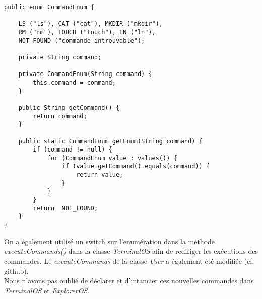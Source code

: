 \begin{lstlisting}
public enum CommandEnum {

    LS ("ls"), CAT ("cat"), MKDIR ("mkdir"), 
    RM ("rm"), TOUCH ("touch"), LN ("ln"),
    NOT_FOUND ("commande introuvable");

    private String command;

    private CommandEnum(String command) {
        this.command = command;
    }

    public String getCommand() {
        return command;
    }

    public static CommandEnum getEnum(String command) {
        if (command != null) {
            for (CommandEnum value : values()) {
                if (value.getCommand().equals(command)) {
                    return value;
                }
            }
        }
        return  NOT_FOUND;
    }
}
\end{lstlisting}

On a également utilisé un switch sur l'enumération dans la méthode \emph{executeCommands()} dans la classe \emph{TerminalOS} afin de rediriger les exécutions des commandes. Le \emph{executeCommands} de la classe \emph{User} a également été modifiée (cf. github).\\

Nous n'avons pas oublié de déclarer et d'intancier ces nouvelles commandes dans \emph{TerminalOS} et \emph{ExplorerOS}.

